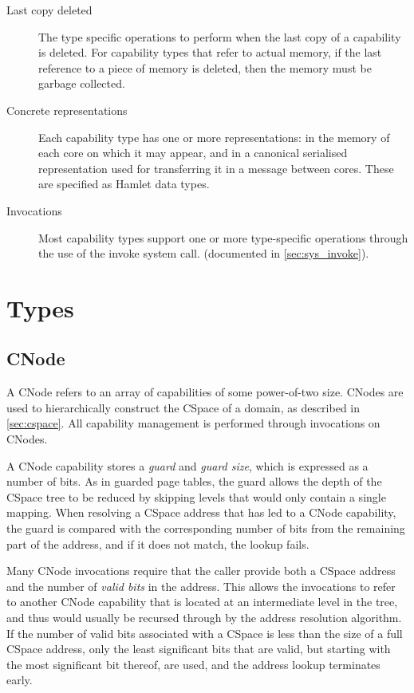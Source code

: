 \begin{description}
\item[Last copy deleted] The type specific operations to perform when
  the last copy of a capability is deleted. For capability types
    that refer to actual memory, if the last reference to a piece of
    memory is deleted, then the memory must be garbage collected.

\item[Concrete representations] Each capability type has one or more
  representations: in the memory of each core on which it may appear,
  and in a canonical serialised representation used for transferring
  it in a message between cores. These are specified as
  Hamlet\cite{dagand:fof:plos09} data types.

\item[Invocations] Most capability types support one or more
  type-specific operations through the use of the invoke system call.
  (documented in \ref{sec:sys_invoke}).
\end{description}

\section{Types}
  
\subsection{CNode}\label{sec:cnode}

A CNode refers to an array of capabilities of some power-of-two size.
CNodes are used to hierarchically construct the CSpace of a domain, as
described in \ref{sec:cspace}.  All capability management is
performed through invocations on CNodes.

A CNode capability stores a \emph{guard} and \emph{guard size}, which
is expressed as a number of bits. As in guarded page
tables\cite{Liedtke_GPT}, the guard allows the depth of the CSpace
tree to be reduced by skipping levels that would only contain a single
mapping. When resolving a CSpace address that has led to a CNode
capability, the guard is compared with the corresponding number of
bits from the remaining part of the address, and if it does not match,
the lookup fails.

Many CNode invocations require that the caller provide both a CSpace
address and the number of \emph{valid bits} in the address. This
allows the invocations to refer to another CNode capability that is
located at an intermediate level in the tree, and thus would usually
be recursed through by the address resolution algorithm. If the number
of valid bits associated with a CSpace is less than the size of a full
CSpace address, only the least significant bits that are valid, but
starting with the most significant bit thereof, are used, and the
address lookup terminates early.

